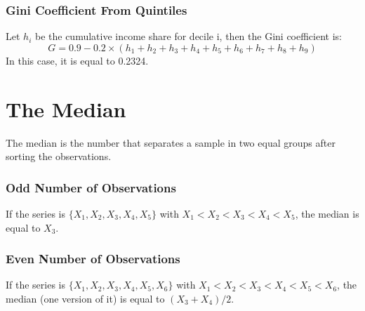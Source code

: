 \documentclass[letterpaper]{article}\usepackage[]{graphicx}\usepackage[]{color}
\numberwithin{exer}{section}
\theoremstyle{nonumberplain}
\begin{document}
\subsubsection*{Gini Coefficient From Quintiles}

Let $h_i$ be the cumulative income share for decile i, then the Gini
coefficient is:
\[
G = 0.9 - 0.2\times(h_1+h_2+h_3+h_4+h_5+h_6+h_7+h_8+h_9)
\]
In this case, it is equal to 0.2324.

\section*{The Median}

The median is the number that separates a sample in two equal groups
after sorting the observations.

\subsubsection*{Odd Number of Observations}

If the series is $\{X_1, X_2, X_3, X_4, X_5\}$ with
$X_1<X_2<X_3<X_4<X_5$, the median is equal to $X_3$.

\subsubsection*{Even Number of Observations}

If the series is $\{X_1, X_2, X_3, X_4, X_5, X_6\}$ with
$X_1<X_2<X_3<X_4<X_5<X_6$, the median (one version of it) is equal to
$(X_3+X_4)/2$.
\end{document}
